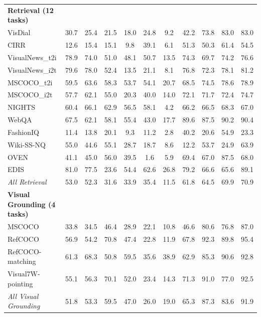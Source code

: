 \documentclass[11pt]{article}
\begin{document}
\begin{table}[]
{\begin{tabular}{lcccccccccc}
\rowcolor{green!15} \textbf{Retrieval (12 tasks)} & & & & & & & & & &\\
VisDial              & 30.7 & 25.4 & 21.5 & 18.0 & 24.8 & 9.2 & 42.2 & 73.8 & 83.0 & 83.0\\
CIRR                 & 12.6 & 15.4 & 15.1 & 9.8  & 39.1 & 6.1 & 51.3 & 50.3 & 61.4 & 54.5\\
VisualNews\_t2i      & 78.9 & 74.0 & 51.0 & 48.1 & 50.7 & 13.5 & 74.3 & 69.7 & 74.2 & 76.6\\
VisualNews\_i2t      & 79.6 & 78.0 & 52.4 & 13.5 & 21.1 & 8.1 & 76.8 & 72.3 & 78.1 & 81.2\\
MSCOCO\_t2i          & 59.5 & 63.6 & 58.3 & 53.7 & 54.1 & 20.7 & 68.5 & 74.5 & 78.6 & 78.9\\
MSCOCO\_i2t          & 57.7 & 62.1 & 55.0 & 20.3 & 40.0 & 14.0 & 72.1 & 71.7 & 72.4 & 74.7\\
NIGHTS               & 60.4 & 66.1 & 62.9 & 56.5 & 58.1  & 4.2 & 66.2 & 66.5 & 68.3 & 67.0\\
WebQA                & 67.5 & 62.1 & 58.1 & 55.4 & 43.0 & 17.7 & 89.6 & 87.5 & 90.2 & 90.4\\
\rowcolor{yellow!10} FashionIQ  & 11.4 & 13.8 & 20.1 & 9.3  & 11.2 & 2.8 & 40.2 & 20.6 & 54.9 & 23.3\\
\rowcolor{yellow!10} Wiki-SS-NQ & 55.0 & 44.6 & 55.1 & 28.7 & 18.7 & 8.6 & 12.2 & 53.7 & 24.9 & 63.9\\
\rowcolor{yellow!10} OVEN       & 41.1 & 45.0 & 56.0 & 39.5 & 1.6  & 5.9 & 69.4 & 67.0 & 87.5 & 68.0\\
\rowcolor{yellow!10} EDIS       & 81.0 & 77.5 & 23.6 & 54.4 & 62.6 & 26.8 & 79.2 & 66.6 & 65.6 & 89.1\\
\textit{All Retrieval} & 53.0 & 52.3 & 31.6 & 33.9 & 35.4 & 11.5 & 61.8 & 64.5 & 69.9 & 70.9\\
\midrule

\rowcolor{purple!15} \textbf{Visual Grounding (4 tasks)} & & & & & & & & & &\\
MSCOCO         & 33.8 & 34.5 & 46.4 & 28.9 & 22.1 & 10.8 & 46.6 & 80.6 & 76.8 & 87.0\\
\rowcolor{yellow!10} RefCOCO  & 56.9 & 54.2 & 70.8 & 47.4 & 22.8 & 11.9 & 67.8 & 92.3 & 89.8 & 95.4\\
\rowcolor{yellow!10} RefCOCO-matching  & 61.3 & 68.3 & 50.8 & 59.5 & 35.6 & 38.9 & 62.9 & 85.3 & 90.6 & 92.8\\
\rowcolor{yellow!10} Visual7W-pointing & 55.1 & 56.3 & 70.1 & 52.0 & 23.4 & 14.3 & 71.3 & 91.0 & 77.0 & 92.5\\
\textit{All Visual Grounding} & 51.8 & 53.3 & 59.5 & 47.0 & 26.0 & 19.0 & 65.3 & 87.3 & 83.6 & 91.9\\
\midrule


\end{tabular}}
\end{table}
\end{document}
